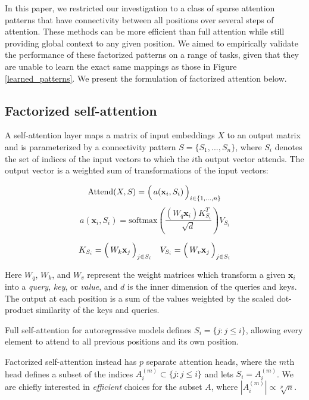 \documentclass{article}
\begin{document}
In this paper, we restricted our investigation to a class of sparse attention patterns that have connectivity between all positions over several steps of attention. These methods can be more efficient than full attention while still providing global context to any given position. We aimed to empirically validate the performance of these factorized patterns on a range of tasks, given that they are unable to learn the exact same mappings as those in Figure \ref{learned_patterns}. We present the formulation of factorized attention below.

\subsection{Factorized self-attention}
A self-attention layer maps a matrix of input embeddings $X$ to an output matrix and is parameterized by a connectivity pattern $S = \{S_1, ..., S_n\}$, where $S_i$ denotes the set of indices of the input vectors to which the $i$th output vector attends. The output vector is a weighted sum of transformations of the input vectors:

\begin{equation}\label{attend_fn}
\mathrm{Attend}(X, S) = \Bigl( \, a(\mathbf{x}_i, S_i) \, \Bigr)_{i \in \{1, ..., n\}}
\end{equation}
\begin{equation}
a(\mathbf{x}_i, S_i) = \mathrm{softmax}\left(\frac{(W_q\mathbf{x}_i)K_{S_i}^T}{\sqrt{d}}\right)V_{S_i}
\end{equation}

\begin{equation}
K_{S_i} = \Bigl( \, W_k \mathbf{x}_j \, \Bigr)_{j \in S_i} \quad V_{S_i} = \Bigl( \, W_v \mathbf{x}_j \, \Bigr)_{j \in S_i}
\end{equation}

Here $W_q$, $W_k$, and $W_v$ represent the weight matrices which transform a given $\mathbf{x}_i$ into a \textit{query}, \textit{key}, or \textit{value}, and $d$ is the inner dimension of the queries and keys. The output at each position is a sum of the values weighted by the scaled dot-product similarity of the keys and queries.

Full self-attention for autoregressive models defines $S_i = \{j : j \le i\}$, allowing every element to attend to all previous positions and its own position. 

Factorized self-attention instead has $p$ separate attention heads, where the $m$th head defines a subset of the indices $A_{i}^{(m)} \subset \{j : j \le i\}$ and lets $S_i = A_{i}^{(m)}$.  We are chiefly interested in \textit{efficient} choices for the subset $A$, where $|A_{i}^{(m)}| \propto \sqrt[p]{n}$.
\end{document}
